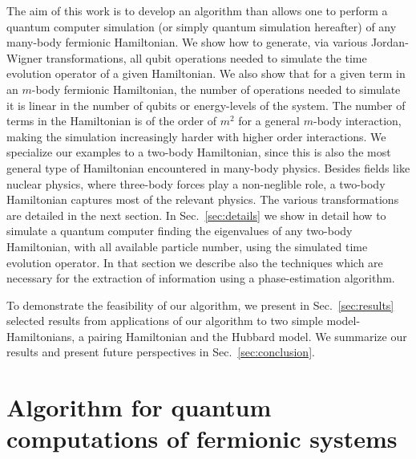 The aim of this work is to develop an algorithm than allows one to perform   
a quantum computer simulation (or simply quantum simulation hereafter) of  any many-body
fermionic Hamiltonian. We show how to generate, via various Jordan-Wigner
transformations, all qubit operations
needed to simulate the time evolution operator of a given  Hamiltonian.
We also show that for a given term in an $m$-body fermionic
Hamiltonian, the number of operations needed to simulate it is linear
in the number of qubits or energy-levels of the system. The number of
terms in the Hamiltonian is of the order of $m^2$ for a
general $m$-body interaction, making the simulation increasingly
harder with higher order interactions. We specialize our examples to a two-body Hamiltonian,
since this is also the most general  type of Hamiltonian encountered in many-body physics.
Besides fields like nuclear physics, where three-body forces play a non-neglible role,
a two-body Hamiltonian captures most of the relevant physics. The various transformations are
detailed in the next section. In Sec.~\ref{sec:details} 
we show in detail how to simulate a quantum computer finding the
eigenvalues of any two-body Hamiltonian, with all available particle
number, 
using the simulated time
evolution operator. In that section we describe also the techniques which are necessary for the
extraction of information using a phase-estimation algorithm. 

To demonstrate the feasibility of our algorithm, 
we present in Sec.~\ref{sec:results} selected results from applications of 
our algorithm to two simple model-Hamiltonians, a pairing Hamiltonian and the Hubbard model.
We summarize our results and present future perspectives in  
Sec.~\ref{sec:conclusion}.


\section{Algorithm for quantum computations of fermionic systems}
\label{sec:algo}
